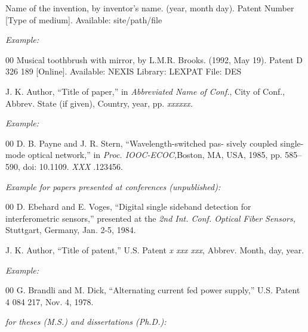 \documentclass{ieeetmlcn}
\begin{document}

\noindent Name of the invention, by inventor's name. (year, month day). Patent Number  [Type
of medium]. Available:  {site/path/file}

{\it Example:}

\begin{thebibliography}{00}
 Musical toothbrush with mirror, by L.M.R. Brooks. (1992, May 19). Patent D 326 189 [Online]. Available: NEXIS Library: LEXPAT File: DES
\end{thebibliography}



\noindent J. K. Author, ``Title of paper,'' in {\it Abbreviated Name of Conf.}, City of Conf., Abbrev. State (if
given), Country, year, pp. {\it xxxxxx.}

{\it Example:}

\begin{thebibliography}{00}
 D. B. Payne and J. R. Stern, ``Wavelength-switched pas- sively coupled single-mode optical network,'' in {\it Proc. IOOC-ECOC,}Boston, MA, USA,  1985,
pp. 585--590, doi:  {10.1109.} {{\it XXX}} {.123456}.
\end{thebibliography}

{\it Example for papers presented at conferences (unpublished):}

\begin{thebibliography}{00}
 D. Ebehard and E. Voges, ``Digital single sideband detection for interferometric sensors,'' presented at the {\it 2nd Int. Conf. Optical Fiber Sensors,} Stuttgart, Germany, Jan. 2-5, 1984.
\end{thebibliography}


\noindent J. K. Author, ``Title of patent,'' U.S. Patent {\it x xxx xxx}, Abbrev. Month, day, year.

{\it Example:}

\begin{thebibliography}{00}
 G. Brandli and M. Dick, ``Alternating current fed power supply,'' U.S. Patent 4 084 217, Nov. 4, 1978.
\end{thebibliography}

 {\it for theses (M.S.) and dissertations (Ph.D.):}
\end{document}
